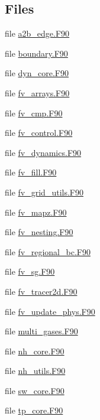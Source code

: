 \subsection*{Files}
\begin{DoxyCompactItemize}
\item 
file \hyperlink{a2b__edge_8F90}{a2b\-\_\-edge.\-F90}
\item 
file \hyperlink{boundary_8F90}{boundary.\-F90}
\item 
file \hyperlink{dyn__core_8F90}{dyn\-\_\-core.\-F90}
\item 
file \hyperlink{fv__arrays_8F90}{fv\-\_\-arrays.\-F90}
\item 
file \hyperlink{fv__cmp_8F90}{fv\-\_\-cmp.\-F90}
\item 
file \hyperlink{fv__control_8F90}{fv\-\_\-control.\-F90}
\item 
file \hyperlink{fv__dynamics_8F90}{fv\-\_\-dynamics.\-F90}
\item 
file \hyperlink{fv__fill_8F90}{fv\-\_\-fill.\-F90}
\item 
file \hyperlink{fv__grid__utils_8F90}{fv\-\_\-grid\-\_\-utils.\-F90}
\item 
file \hyperlink{fv__mapz_8F90}{fv\-\_\-mapz.\-F90}
\item 
file \hyperlink{fv__nesting_8F90}{fv\-\_\-nesting.\-F90}
\item 
file \hyperlink{fv__regional__bc_8F90}{fv\-\_\-regional\-\_\-bc.\-F90}
\item 
file \hyperlink{fv__sg_8F90}{fv\-\_\-sg.\-F90}
\item 
file \hyperlink{fv__tracer2d_8F90}{fv\-\_\-tracer2d.\-F90}
\item 
file \hyperlink{fv__update__phys_8F90}{fv\-\_\-update\-\_\-phys.\-F90}
\item 
file \hyperlink{multi__gases_8F90}{multi\-\_\-gases.\-F90}
\item 
file \hyperlink{nh__core_8F90}{nh\-\_\-core.\-F90}
\item 
file \hyperlink{nh__utils_8F90}{nh\-\_\-utils.\-F90}
\item 
file \hyperlink{sw__core_8F90}{sw\-\_\-core.\-F90}
\item 
file \hyperlink{tp__core_8F90}{tp\-\_\-core.\-F90}
\end{DoxyCompactItemize}
